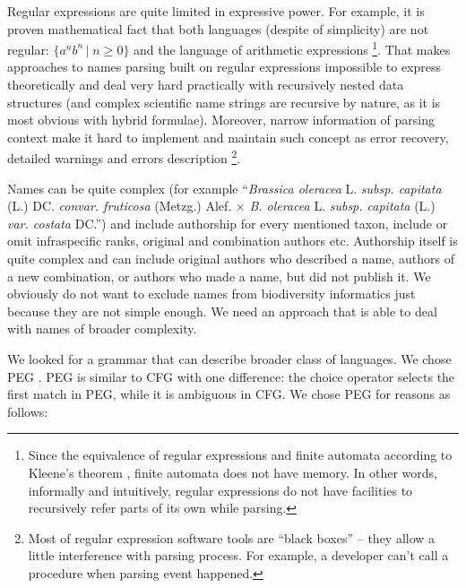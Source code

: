 \documentclass{bmcart}
\begin{document}
Regular expressions are quite limited in expressive power. For example, it is
proven mathematical fact that both languages (despite of simplicity) are not
regular: $\{a^nb^n\,\vert\; n\ge 0\} $ and the language of arithmetic
expressions \footnote{Since the equivalence of regular expressions and finite
automata according to Kleene's theorem \cite{yu1997handbook}, finite automata
does not have memory. In other words, informally and intuitively, regular
expressions do not have facilities to recursively refer parts of its own while
parsing.}. That makes approaches to names parsing built on regular expressions
\cite{gbif} impossible to express theoretically and deal very hard practically
with recursively nested data structures (and complex scientific name strings
are recursive by nature, as it is most obvious with hybrid formulae).
Moreover, narrow information of parsing context make it hard to implement and
maintain such concept as error recovery, detailed warnings and errors
description \footnote{Most of regular expression software tools are ``black
boxes'' -- they allow a little interference with parsing process. For example, a
developer can't call a procedure when parsing event happened.}.

Names can be quite complex (for example ``\textit{Brassica oleracea} L.
\textit{subsp.  capitata} (L.) DC. \textit{convar. fruticosa} (Metzg.) Alef.
$\times$ \textit{B. oleracea} L. \textit{subsp. capitata} (L.) \textit{var.
costata} DC.'')  and include authorship for every mentioned taxon, include or
omit infraspecific ranks, original and combination authors etc. Authorship
itself is quite complex and can include original authors who described a name,
authors of a new combination, or authors who made a name, but did not publish
it. We obviously do not want to exclude names from biodiversity informatics
just because they are not simple enough. We need an approach that is able to
deal with names of broader complexity.

We looked for a grammar that can describe broader class of languages. We chose
PEG \cite{Ford2004}. PEG is similar to CFG with one difference: the choice
operator selects the first match in PEG, while it is ambiguous in CFG. We
chose PEG for reasons as follows:
\end{document}
